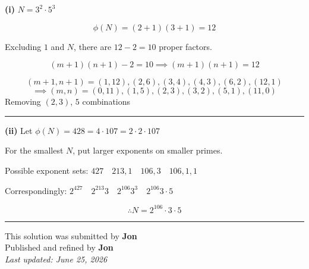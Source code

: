 \documentclass[12pt]{article}
\begin{document}
\newcommand{\ds}{\displaystyle}

\textbf{(i)} $N=3^2\cdot5^3$

$$\phi(N)=(2+1)(3+1)=12$$

Excluding $1$ and $N$,  there are $12-2=10$ proper factors.

$$(m+1)(n+1)-2=10\implies (m+1)(n+1)=12$$

$$(m+1,n+1)=(1,12),(2,6),(3,4),(4,3),(6,2),(12,1)$$
$$\implies (m,n)=(0,11),(1,5),(2,3),(3,2),(5,1),(11,0)$$
Removing $(2,3)$, $\boxed{5}$ combinations

\bigskip\hrule\bigskip

\textbf{(ii)} Let $\phi(N)=428=4\cdot107=2\cdot2\cdot107$

For the smallest $N$, put larger exponents on smaller primes.

Possible exponent sets: $427\quad 213,1\quad 106,3\quad 106,1,1$

Correspondingly: $2^{427}\quad 2^{213}3\quad 2^{106}3^3\quad 2^{106}3\cdot5$

$$\therefore \boxed{N=2^{106}\cdot3\cdot5}$$

\bigskip
\hrule
\begin{center}
    This solution was submitted by \textbf{Jon}\\[4pt]
    Published and refined by \textbf{Jon}\\[8pt]
    \textit{Last updated: June 25, 2026}
\end{center}
\end{document}
